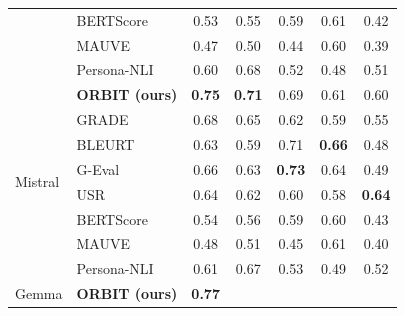 \documentclass[11pt]{article}
\begin{document}
\begin{longtable}{llccccc}
& BERTScore          & \cellcolor{red!20}0.53            & \cellcolor{red!20}0.55            & \cellcolor{yellow!15}0.59 & \cellcolor{yellow!25}0.61 & \cellcolor{red!40}0.42 \\
& MAUVE              & \cellcolor{red!40}0.47            & \cellcolor{red!40}0.50            & \cellcolor{red!40}0.44    & \cellcolor{yellow!25}0.60 & \cellcolor{red!40}0.39 \\
& Persona-NLI        & \cellcolor{yellow!25}0.60         & \cellcolor{green!15}0.68          & \cellcolor{red!20}0.52    & \cellcolor{red!20}0.48 & \cellcolor{yellow!25}0.51 \\
\midrule
\multirow{8}{*}{Mistral} 
& \textbf{ORBIT (ours)} &
\cellcolor{green!30}\textbf{0.75} &
\cellcolor{green!25}\textbf{0.71} &
\cellcolor{yellow!25}0.69 &
\cellcolor{yellow!20}0.61 &
\cellcolor{yellow!20}0.60 \\
& GRADE &
\cellcolor{green!15}0.68 &
\cellcolor{green!15}0.65 &
\cellcolor{yellow!25}0.62 &
\cellcolor{yellow!25}0.59 &
\cellcolor{yellow!15}0.55 \\
& BLEURT &
\cellcolor{yellow!25}0.63 &
\cellcolor{yellow!25}0.59 &
\cellcolor{green!15}0.71 &
\cellcolor{green!20}\textbf{0.66} &
\cellcolor{red!15}0.48 \\
& G-Eval &
\cellcolor{green!15}0.66 &
\cellcolor{green!15}0.63 &
\cellcolor{green!30}\textbf{0.73} &
\cellcolor{green!15}0.64 &
\cellcolor{red!20}0.49 \\
& USR &
\cellcolor{green!15}0.64 &
\cellcolor{green!15}0.62 &
\cellcolor{yellow!20}0.60 &
\cellcolor{yellow!15}0.58 &
\cellcolor{green!25}\textbf{0.64} \\
& BERTScore &
\cellcolor{red!20}0.54 &
\cellcolor{red!20}0.56 &
\cellcolor{yellow!15}0.59 &
\cellcolor{yellow!25}0.60 &
\cellcolor{red!30}0.43 \\
& MAUVE &
\cellcolor{red!30}0.48 &
\cellcolor{red!30}0.51 &
\cellcolor{red!30}0.45 &
\cellcolor{yellow!25}0.61 &
\cellcolor{red!30}0.40 \\
& Persona-NLI &
\cellcolor{yellow!25}0.61 &
\cellcolor{green!15}0.67 &
\cellcolor{red!20}0.53 &
\cellcolor{red!20}0.49 &
\cellcolor{yellow!25}0.52 \\
\midrule
\multirow{8}{*}{Gemma} 
& \textbf{ORBIT (ours)} &
\cellcolor{green!35}\textbf{0.77} &

\end{longtable}
\end{document}
